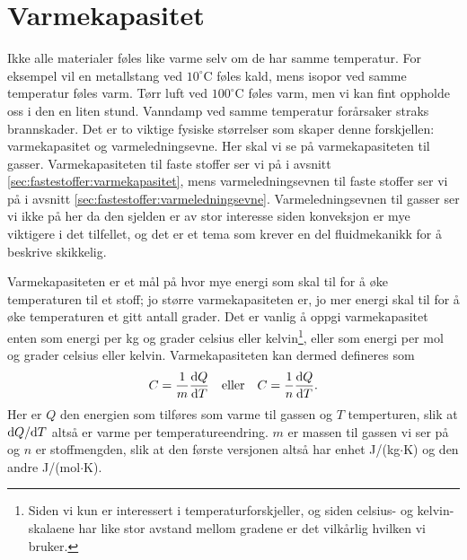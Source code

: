 \section{Varmekapasitet}
Ikke alle materialer føles like varme selv om de har samme temperatur. For eksempel vil en metallstang ved $10^\circ\mathrm{C}$ føles kald, mens isopor ved samme temperatur føles varm. Tørr luft ved $100^\circ\mathrm{C}$ føles varm, men vi kan fint oppholde oss i den en liten stund. Vanndamp ved samme temperatur forårsaker straks brannskader. Det er to viktige fysiske størrelser som skaper denne forskjellen: varmekapasitet og varmeledningsevne. Her skal vi se på varmekapasiteten til gasser. Varmekapasiteten til faste stoffer ser vi på i avsnitt \ref{sec:fastestoffer:varmekapasitet}, mens varmeledningsevnen til faste stoffer ser vi på i avsnitt \ref{sec:fastestoffer:varmeledningsevne}. Varmeledningsevnen til gasser ser vi ikke på her da den sjelden er av stor interesse siden konveksjon er mye viktigere i det tilfellet, og det er et tema som krever en del fluidmekanikk for å beskrive skikkelig.

Varmekapasiteten er et mål på hvor mye energi som skal til for å øke temperaturen til et stoff; jo større varmekapasiteten er, jo mer energi skal til for å øke temperaturen et gitt antall grader. Det er vanlig å oppgi varmekapasitet enten som energi per kg og grader celsius eller kelvin\footnote{Siden vi kun er interessert i temperaturforskjeller, og siden celsius- og kelvin-skalaene har like stor avstand mellom gradene er det vilkårlig hvilken vi bruker.}, eller som energi per mol og grader celsius eller kelvin. Varmekapasiteten kan dermed defineres som 
\begin{displaymath}
	C = \frac{1}{m}\frac{\text{d} Q}{\text{d} T}\quad\text{eller}\quad
	C = \frac{1}{n}\frac{\text{d} Q}{\text{d} T}.
\end{displaymath}
Her er $Q$ den energien som tilføres som varme til gassen og $T$ temperturen, slik at $\text{d} Q/\text{d} T$ altså er varme per temperatureendring. $m$ er massen til gassen vi ser på og $n$ er stoffmengden, slik at den første versjonen altså har enhet J/(kg$\cdot$K) og den andre J/(mol$\cdot$K).


